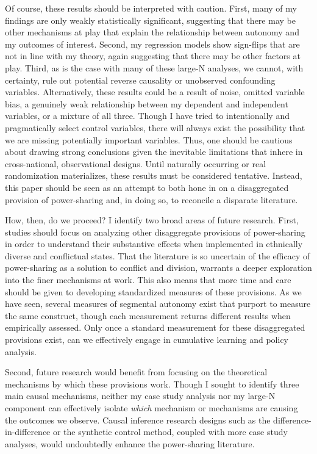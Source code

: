 \documentclass[12pt]{article}
\begin{document}
Of course, these results should be interpreted with caution. First, many of my findings are only weakly statistically significant, suggesting that there may be other mechanisms at play that explain the relationship between autonomy and my outcomes of interest. Second, my regression models show sign-flips that are not in line with my theory, again suggesting that there may be other factors at play. Third, as is the case with many of these large-N analyses, we cannot, with certainty, rule out potential reverse causality or unobserved confounding variables. Alternatively, these results could be a result of noise, omitted variable bias, a genuinely weak relationship between my dependent and independent variables, or a mixture of all three. Though I have tried to intentionally and pragmatically select control variables, there will always exist the possibility that we are missing potentially important variables. Thus, one should be cautious about drawing strong conclusions given the inevitable limitations that inhere in cross-national, observational designs. Until naturally occurring or real randomization materializes, these results must be considered tentative. Instead, this paper should be seen as an attempt to both hone in on a disaggregated provision of power-sharing and, in doing so, to reconcile a disparate literature.

How, then, do we proceed? I identify two broad areas of future research. First, studies should focus on analyzing other disaggregate provisions of power-sharing in order to understand their substantive effects when implemented in ethnically diverse and conflictual states. That the literature is so uncertain of the efficacy of power-sharing as a solution to conflict and division, warrants a deeper exploration into the finer mechanisms at work. This also means that more time and care should be given to developing standardized measures of these provisions. As we have seen, several measures of segmental autonomy exist that purport to measure the same construct, though each measurement returns different results when empirically assessed. Only once a standard measurement for these disaggregated provisions exist, can we effectively engage in cumulative learning and policy analysis.  

Second, future research would benefit from focusing on the theoretical mechanisms by which these provisions work. Though I sought to identify three main causal mechanisms, neither my case study analysis nor my large-N component can effectively isolate \textit{which} mechanism or mechanisms are causing the outcomes we observe. Causal inference research designs such as the difference-in-difference or the synthetic control method, coupled with more case study analyses, would undoubtedly enhance the power-sharing literature.
\end{document}
